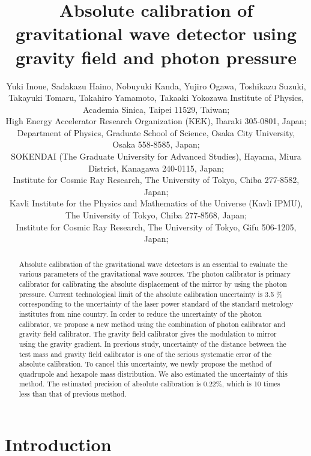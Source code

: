 \documentclass[A4]{spie}  %
\title{Absolute calibration of gravitational wave detector using gravity field and photon pressure}
\author{Yuki Inoue\supit{a,b}, Sadakazu Haino\supit{a,b}, Nobuyuki Kanda\supit{c}, Yujiro Ogawa\supit{b,d}, Toshikazu Suzuki\supit{b,e,f}, Takayuki Tomaru\supit{b,d,e,f}, Takahiro Yamamoto\supit{g}, Takaaki Yokozawa\supit{g}
\skiplinehalf
\supit{a}Institute of Physics, Academia Sinica, Taipei 11529, Taiwan; \\
\supit{b}High Energy Accelerator Research Organization (KEK), Ibaraki 305-0801, Japan;\\
\supit{c}Department of Physics, Graduate School of Science, Osaka City University, Osaka 558-8585, Japan;\\
\supit{d}SOKENDAI (The Graduate University for Advanced Studies), Hayama, Miura District, Kanagawa 240-0115, Japan;\\
\supit{e}Institute for Cosmic Ray Research, The University of Tokyo, Chiba 277-8582, Japan;\\
\supit{f}Kavli Institute for the Physics and Mathematics of the Universe (Kavli IPMU), The University of Tokyo, Chiba 277-8568, Japan;\\
\supit{g}Institute for Cosmic Ray Research, The University of Tokyo, Gifu 506-1205, Japan;\\
}
\begin{document}
 
\maketitle 

\begin{abstract}
Absolute calibration of the gravitational wave detectors is an essential to evaluate the various parameters of the gravitational wave sources. 
The photon calibrator is primary calibrator for calibrating the absolute displacement of the mirror by using the photon pressure. 
Current technological limit of the absolute calibration uncertainty is 3.5 \% corresponding to the uncertainty of the laser power standard of the standard metrology institutes from nine country.  In order to reduce the uncertainty of the photon calibrator, we propose a new method using the combination of photon calibrator and gravity field calibrator. The gravity field calibrator gives the modulation to mirror using the gravity gradient. In previous study, uncertainty of the distance between the test mass and gravity field calibrator is one of the serious systematic error of the absolute calibration. To cancel this uncertainty, we newly propose the method of quadrupole and hexapole mass distribution.  We also estimated the uncertainty of this method. The estimated precision of absolute calibration is 0.22\%, which is 10 times less than that of previous method.

\end{abstract}



\section{Introduction}
\end{document}

